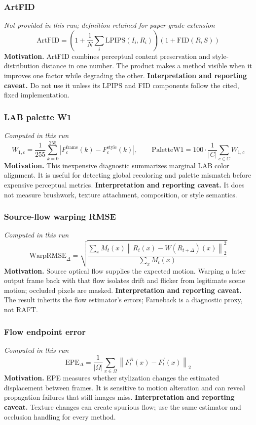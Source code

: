 \documentclass[10pt]{article}
\begin{document}
\subsubsection*{ArtFID}
\textit{Not provided in this run; definition retained for paper-grade extension}
\begin{equation*}
\mathrm{ArtFID}=\left(1+\frac{1}{N}\sum_i\mathrm{LPIPS}(I_i,R_i)\right)\left(1+\mathrm{FID}(R,S)\right)
\end{equation*}
\textbf{Motivation.} ArtFID combines perceptual content preservation and style-distribution distance in one number. The product makes a method visible when it improves one factor while degrading the other.
\textbf{Interpretation and reporting caveat.} Do not use it unless its LPIPS and FID components follow the cited, fixed implementation.
\subsubsection*{LAB palette W1}
\textit{Computed in this run}
\begin{equation*}
W_{1,c}=\frac{1}{255}\sum_{k=0}^{255}\left|F^{\mathrm{frame}}_c(k)-F^{\mathrm{style}}_c(k)\right|,\qquad \mathrm{PaletteW1}=100\cdot\frac{1}{|C|}\sum_{c\in C}W_{1,c}
\end{equation*}
\textbf{Motivation.} This inexpensive diagnostic summarizes marginal LAB color alignment. It is useful for detecting global recoloring and palette mismatch before expensive perceptual metrics.
\textbf{Interpretation and reporting caveat.} It does not measure brushwork, texture attachment, composition, or style semantics.
\subsubsection*{Source-flow warping RMSE}
\textit{Computed in this run}
\begin{equation*}
\mathrm{WarpRMSE}_{\Delta}=\sqrt{\frac{\sum_x M_t(x)\left\|R_t(x)-W(R_{t+\Delta})(x)\right\|_2^2}{\sum_x M_t(x)}}
\end{equation*}
\textbf{Motivation.} Source optical flow supplies the expected motion. Warping a later output frame back with that flow isolates drift and flicker from legitimate scene motion; occluded pixels are masked.
\textbf{Interpretation and reporting caveat.} The result inherits the flow estimator's errors; Farneback is a diagnostic proxy, not RAFT.
\subsubsection*{Flow endpoint error}
\textit{Computed in this run}
\begin{equation*}
\mathrm{EPE}_{\Delta}=\frac{1}{|\Omega|}\sum_{x\in\Omega}\left\|F^R_t(x)-F^I_t(x)\right\|_2
\end{equation*}
\textbf{Motivation.} EPE measures whether stylization changes the estimated displacement between frames. It is sensitive to motion alteration and can reveal propagation failures that still images miss.
\textbf{Interpretation and reporting caveat.} Texture changes can create spurious flow; use the same estimator and occlusion handling for every method.
\end{document}

